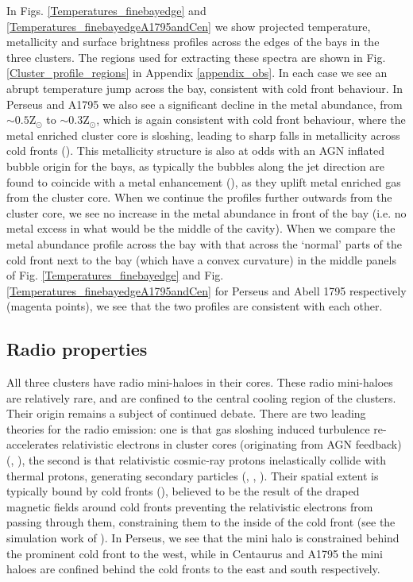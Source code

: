 \documentclass[useAMS,usenatbib]{mn2e}
\begin{document}
In Figs. \ref{Temperatures_finebayedge} and
\ref{Temperatures_finebayedgeA1795andCen} we show projected temperature,
metallicity and surface brightness profiles across the edges of the bays in the
three clusters. The regions used for extracting these spectra are shown in Fig. \ref{Cluster_profile_regions} in Appendix \ref{appendix_obs}. In each case we see an abrupt temperature jump across the bay,
consistent with cold front behaviour. In Perseus and A1795 we also see a
significant decline in the metal abundance, from $\sim0.5$Z$_{\odot}$ to
$\sim0.3$Z$_{\odot}$, which is again consistent with cold front behaviour, where
the metal enriched cluster core is sloshing, leading to sharp falls in
metallicity across cold fronts (\citealt{Roediger2011}). This metallicity structure is also at odds with an AGN inflated bubble origin
for the bays, as typically the bubbles along the jet direction are found to
coincide with a metal enhancement (\citealt{Kirkpatrick2011}), as they uplift
metal enriched gas from the cluster core. When we continue the profiles further outwards from the cluster core, we see no increase in the 
metal abundance in front of the bay (i.e. no metal excess in what would be the middle of the cavity). When we compare the metal abundance profile across the bay with that across the `normal' parts of the cold
front next to the bay (which have a convex curvature) in the middle panels of Fig. \ref{Temperatures_finebayedge} and Fig. \ref {Temperatures_finebayedgeA1795andCen} for Perseus and Abell 1795 respectively 
(magenta points), we see that the two profiles are consistent with each other. 

\subsection{Radio properties}


All three clusters have radio mini-haloes in their cores. These radio
mini-haloes are relatively rare, and are confined to the central cooling region
of the clusters. Their origin remains a subject of continued debate. There are
two leading theories for the radio emission: one is that  
gas sloshing induced turbulence re-accelerates relativistic electrons in cluster
cores (originating from AGN feedback) (\citealt{Gitti2002},
\citealt{Gitti2004}), the second is that relativistic cosmic-ray protons
inelastically collide with thermal protons, generating secondary particles
(\citealt{Pfrommer2004}, \citealt{KeshetLoeb2010}, \citealt{Keshet2010}). Their
spatial extent is typically bound by cold fronts (\citealt{Mazzotta2008}),
believed to be the result of the draped magnetic fields around cold fronts
preventing the relativistic electrons from passing through them, constraining
them to the inside of the cold front (see the simulation work of
\citealt{ZuHone2013}). In Perseus, we see that the mini halo is constrained
behind the prominent cold front to the west, while in Centaurus and A1795 the
mini haloes are confined behind the cold fronts to the east and south
respectively.
\end{document}
